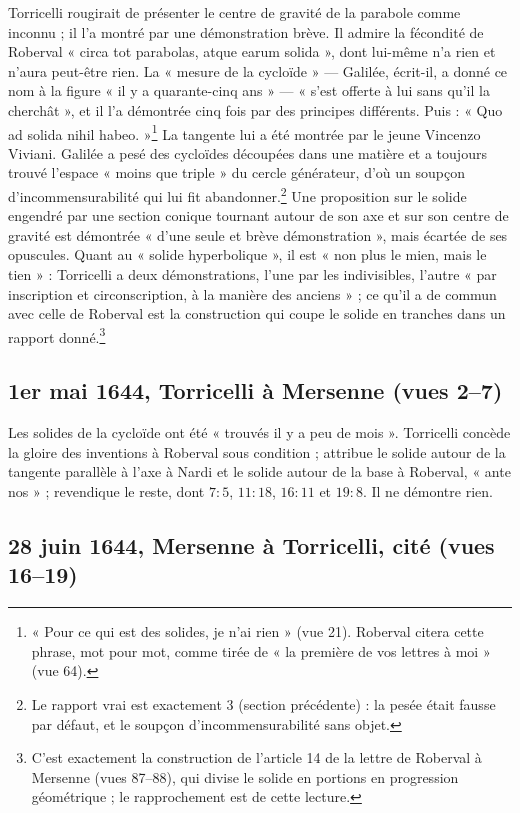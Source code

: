 \documentclass[11pt,a4paper]{article}
\begin{document}
Torricelli rougirait de présenter le centre de gravité de la parabole comme
inconnu ; il l'a montré par une démonstration brève. Il admire la fécondité de
Roberval « circa tot parabolas, atque earum solida », dont lui-même n'a rien et
n'aura peut-être rien. La « mesure de la cycloïde » — Galilée, écrit-il, a donné
ce nom à la figure « il y a quarante-cinq ans » — « s'est offerte à lui sans
qu'il la cherchât », et il l'a démontrée cinq fois par des principes différents.
Puis : « Quo ad solida nihil habeo. »\footnote{« Pour ce qui est des solides, je
n'ai rien » (vue 21). Roberval citera cette phrase, mot pour mot, comme tirée de
« la première de vos lettres à moi » (vue 64).} La tangente lui a été montrée
par le jeune Vincenzo Viviani. Galilée a pesé des cycloïdes découpées dans une
matière et a toujours trouvé l'espace « moins que triple » du cercle générateur,
d'où un soupçon d'incommensurabilité qui lui fit abandonner.\footnote{Le rapport
vrai est exactement $3$ (section précédente) : la pesée était fausse par défaut,
et le soupçon d'incommensurabilité sans objet.} Une proposition sur le solide
engendré par une section conique tournant autour de son axe et sur son centre de
gravité est démontrée « d'une seule et brève démonstration », mais écartée
de ses opuscules. Quant au « solide hyperbolique », il est « non plus le mien,
mais le tien » : Torricelli a deux démonstrations, l'une par les indivisibles,
l'autre « par inscription et circonscription, à la manière des anciens » ; ce
qu'il a de commun avec celle de Roberval est la construction qui coupe le solide
en tranches dans un rapport donné.\footnote{C'est exactement la construction de
l'article 14 de la lettre de Roberval à Mersenne (vues 87--88), qui divise le
solide en portions en progression géométrique ; le rapprochement est de cette
lecture.}

\subsection*{1er mai 1644, Torricelli à Mersenne (vues 2--7)}

Les solides de la cycloïde ont été « trouvés il y a peu de mois ». Torricelli
concède la gloire des inventions à Roberval sous condition ; attribue le solide
autour de la tangente parallèle à l'axe à Nardi et le solide autour de la base à
Roberval, « ante nos » ; revendique le reste, dont $7:5$, $11:18$, $16:11$ et
$19:8$. Il ne démontre rien.

\subsection*{28 juin 1644, Mersenne à Torricelli, cité (vues 16--19)}
\end{document}
